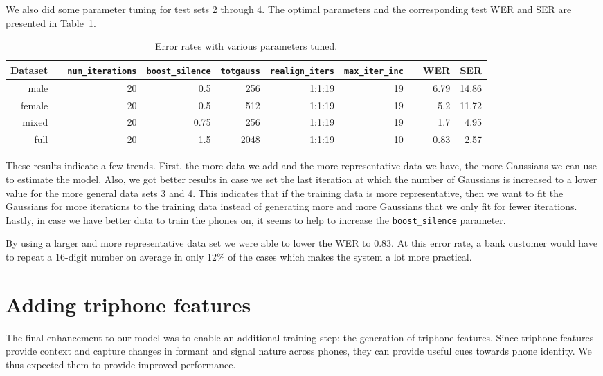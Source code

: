\documentclass[twocolumn, 11pt]{article}
\begin{document}
We also did some parameter tuning for test sets 2 through 4. The optimal
parameters and the corresponding test WER and SER are presented in
Table~\ref{tab:wer-param}.

\begin{table}\centering
  \begin{tabular}{@{}rcrrrrrcrr@{}}\toprule%
    Dataset & \phantom{a} & \texttt{num\_iterations} & \texttt{boost\_silence}
    & \texttt{totgauss} & \texttt{realign\_iters} & \texttt{max\_iter\_inc}
    & \phantom{a} & WER & SER\\ \midrule%
    male && 20 & 0.5 & 256 & 1:1:19 & 19 && 6.79 & 14.86\\
    female && 20 & 0.5 & 512 & 1:1:19 & 19 && 5.2 & 11.72\\
    mixed && 20 & 0.75 & 256 & 1:1:19 & 19 && 1.7 & 4.95\\
    full && 20 & 1.5 & 2048 & 1:1:19 & 10 && 0.83 & 2.57\\
  \end{tabular}
  \caption{Error rates with various parameters tuned.}\label{tab:wer-param}
\end{table}

These results indicate a few trends. First, the more data we add and the more
representative data we have, the more Gaussians we can use to estimate the
model. Also, we got better results in case we set the last iteration at which
the number of Gaussians is increased to a lower value for the more general data
sets 3 and 4. This indicates that if the training data is more representative,
then we want to fit the Gaussians for more iterations to the training data
instead of generating more and more Gaussians that we only fit for fewer
iterations. Lastly, in case we have better data to train the phones on, it seems
to help to increase the \texttt{boost\_silence} parameter.

By using a larger and  more representative data set we were able to lower the
WER to 0.83. At this error rate, a bank customer would have to repeat a 16-digit
number on average in only 12\% of the cases which makes the system a lot more
practical.

\section{Adding triphone features}

The final enhancement to our model was to enable an additional training step:
the generation of triphone features. Since triphone features provide context and
capture changes in formant and signal nature across phones, they can provide
useful cues towards phone identity. We thus expected them to provide improved
performance.
\end{document}
